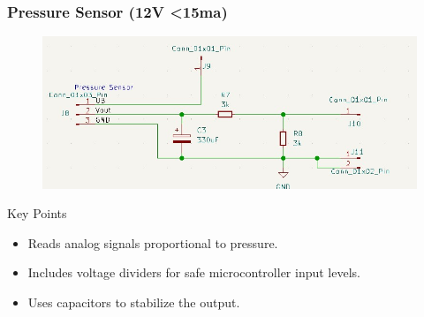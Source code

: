 \documentclass[8pt,compress]{beamer}
\begin{document}
\begin{frame}
  \frametitle{Pressure Sensor (12V <15ma)}
  \begin{minipage}{0.65\textwidth}
    \begin{figure}
      \includegraphics[width=\textwidth]{assets/electronic/pressure_schem.jpg}
    \end{figure}
  \end{minipage}
  \hfill
  \begin{minipage}{0.3\textwidth}
    \begin{block}{Key Points}
      \begin{itemize}
        \item Reads analog signals proportional to pressure.
        \item Includes voltage dividers for safe microcontroller input levels.
        \item Uses capacitors to stabilize the output.
      \end{itemize}
    \end{block}
  \end{minipage}
\end{frame}
\end{document}
